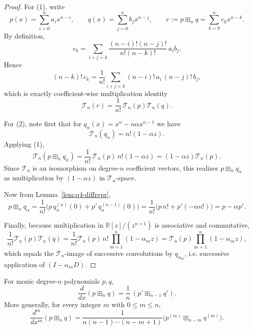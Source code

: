 \begin{proof}
For (1), write
\[
p(x)=\sum_{i=0}^{n}a_i x^{n-i},\qquad
q(x)=\sum_{j=0}^{n}b_j x^{n-j},\qquad
r:=p\boxplus_n q=\sum_{k=0}^{n}c_k x^{n-k}.
\]
By definition,
\[
c_k=\sum_{i+j=k}\frac{(n-i)!(n-j)!}{n!(n-k)!}\,a_i b_j.
\]
Hence
\[
(n-k)!\,c_k=\frac1{n!}\sum_{i+j=k}(n-i)!\,a_i\,(n-j)!\,b_j,
\]
which is exactly coefficient-wise multiplication identity
\[
\mathcal T_n(r)=\frac1{n!}\,\mathcal T_n(p)\mathcal T_n(q).
\]

For (2), note first that for $q_{\alpha}(x)=x^n-n\alpha x^{n-1}$ we have
\[
\mathcal T_n(q_\alpha)=n!(1-\alpha z).
\]
Applying (1),
\[
\mathcal T_n(p\boxplus_n q_\alpha)=\frac1{n!}\,\mathcal T_n(p)\,n!(1-\alpha z)
=(1-\alpha z)\mathcal T_n(p).
\]
Since $\mathcal T_n$ is an isomorphism on degree-$n$ coefficient vectors, this realizes $p\boxplus_n q_\alpha$ as multiplication by $(1-\alpha z)$ in $\mathcal T_n$-space.

Now from Lemma~\ref{lem:q4-diffrepr},
\[
p\boxplus_n q_\alpha
=
\frac1{n!}\bigl(p\,q_\alpha^{(n)}(0)+p'\,q_\alpha^{(n-1)}(0)\bigr)
=
\frac1{n!}\bigl(p\,n!+p'(-\alpha n!)\bigr)=p-\alpha p'.
\]

Finally, because multiplication in $\mathbb R[z]/(z^{n+1})$ is associative and commutative,
\[
\frac1{n!}\mathcal T_n(p)\mathcal T_n(q)
=
\frac1{n!}\mathcal T_n(p)\,n!\prod_{m=1}^{n}(1-\alpha_m z)
=
\mathcal T_n(p)\prod_{m=1}^{n}(1-\alpha_m z),
\]
which equals the $\mathcal T_n$-image of successive convolutions by $q_{\alpha_m}$, i.e. successive application of $(I-\alpha_m D)$.
\end{proof}

\begin{lemma}\label{lem:q4-deriv-recursion}
For monic degree-$n$ polynomials $p,q$,
\[
\frac{d}{dx}(p\boxplus_n q)
=
\frac1n\,(p'\boxplus_{n-1} q').
\]
More generally, for every integer $m$ with $0\le m\le n$,
\[
\frac{d^m}{dx^m}(p\boxplus_n q)
=
\frac{1}{n(n-1)\cdots(n-m+1)}
\bigl(p^{(m)}\boxplus_{n-m} q^{(m)}\bigr).
\]
\end{lemma}

